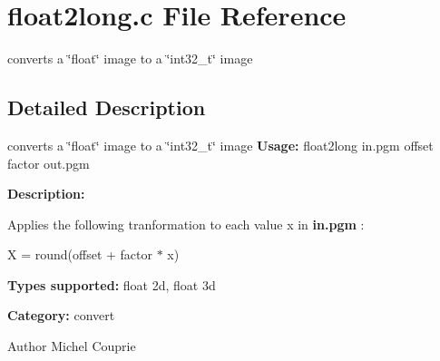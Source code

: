\section{float2long.c File Reference}
\label{float2long_8c}


converts a \char`\"{}float\char`\"{} image to a \char`\"{}int32\_\-t\char`\"{} image  




\subsection{Detailed Description}
converts a \char`\"{}float\char`\"{} image to a \char`\"{}int32\_\-t\char`\"{} image {\bfseries Usage:} float2long in.pgm offset factor out.pgm

{\bfseries Description:}

Applies the following tranformation to each value x in {\bfseries in.pgm} :

X = round(offset + factor $\ast$ x)

{\bfseries Types supported:} float 2d, float 3d

{\bfseries Category:} convert

\begin{DoxyAuthor}{Author}
Michel Couprie 
\end{DoxyAuthor}

